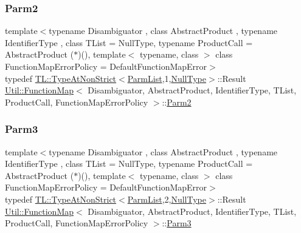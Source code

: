 \subsubsection{\texorpdfstring{Parm2}{Parm2}\hspace{0.1cm}{\footnotesize\ttfamily [3/3]}}
{\footnotesize\ttfamily template$<$typename Disambiguator , class Abstract\+Product , typename Identifier\+Type , class T\+List  = Null\+Type, typename Product\+Call  = Abstract\+Product ($\ast$)(), template$<$ typename, class $>$ class Function\+Map\+Error\+Policy = Default\+Function\+Map\+Error$>$ \\
typedef \mbox{\hyperlink{structUtil_1_1TL_1_1TypeAtNonStrict}{T\+L\+::\+Type\+At\+Non\+Strict}}$<$\mbox{\hyperlink{classUtil_1_1FunctionMap_a6cf0e6766cf6f20642ba61c4994bb477}{Parm\+List}},1,\mbox{\hyperlink{classUtil_1_1NullType}{Null\+Type}}$>$\+::Result \mbox{\hyperlink{classUtil_1_1FunctionMap}{Util\+::\+Function\+Map}}$<$ Disambiguator, Abstract\+Product, Identifier\+Type, T\+List, Product\+Call, Function\+Map\+Error\+Policy $>$\+::\mbox{\hyperlink{classUtil_1_1FunctionMap_a46a76423783c6a8dcc4442ffb8cf54a4}{Parm2}}}

\mbox{\label{classUtil_1_1FunctionMap_a4578d42cd0723beba85654aa774d0145}} 
\subsubsection{\texorpdfstring{Parm3}{Parm3}\hspace{0.1cm}{\footnotesize\ttfamily [1/3]}}
{\footnotesize\ttfamily template$<$typename Disambiguator , class Abstract\+Product , typename Identifier\+Type , class T\+List  = Null\+Type, typename Product\+Call  = Abstract\+Product ($\ast$)(), template$<$ typename, class $>$ class Function\+Map\+Error\+Policy = Default\+Function\+Map\+Error$>$ \\
typedef \mbox{\hyperlink{structUtil_1_1TL_1_1TypeAtNonStrict}{T\+L\+::\+Type\+At\+Non\+Strict}}$<$\mbox{\hyperlink{classUtil_1_1FunctionMap_a6cf0e6766cf6f20642ba61c4994bb477}{Parm\+List}},2,\mbox{\hyperlink{classUtil_1_1NullType}{Null\+Type}}$>$\+::Result \mbox{\hyperlink{classUtil_1_1FunctionMap}{Util\+::\+Function\+Map}}$<$ Disambiguator, Abstract\+Product, Identifier\+Type, T\+List, Product\+Call, Function\+Map\+Error\+Policy $>$\+::\mbox{\hyperlink{classUtil_1_1FunctionMap_a4578d42cd0723beba85654aa774d0145}{Parm3}}}

